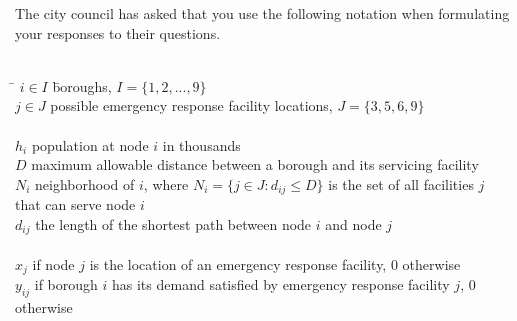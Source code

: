 \documentclass[12pt]{exam}
\begin{document}
\begin{questions}
\begin{center}
\end{center}

\noindent The city council has asked that you use the following notation when formulating your responses to their questions.

\begin{tabbing}
\\[0.2cm]
\hspace*{.25cm} \= $i\in I$ \hspace{0.3cm} \= boroughs, $I=\{1,2,...,9\}$ \\
\> $j\in J$ \> possible emergency response facility locations, $J=\{3,5,6,9\}$\\[0.2cm]
\\[0.2cm]
\> $h_i$ \> population at node $i$ in thousands\\
\> $D$ \> maximum allowable distance between a borough and its servicing facility \\
\> $N_i$ \> neighborhood of $i$, where $N_i = \{ j  \in J : d_{ij} \leq D \}$  is the set of all facilities $j$\\
\>            \> that can serve node $i$ \\
\> $d_{ij}$ \> the length of the shortest path between node $i$ and node $j$ \\[0.2cm]
\\
\> $x_j$  if node $j$ is the location of an emergency response facility, 0 otherwise\\
\> $y_{ij}$  if borough $i$ has its demand satisfied by emergency response facility $j$, 0 otherwise\\[0.2cm]
\end{tabbing}

\begin{parts}

\end{parts}
\end{questions}
\end{document}
